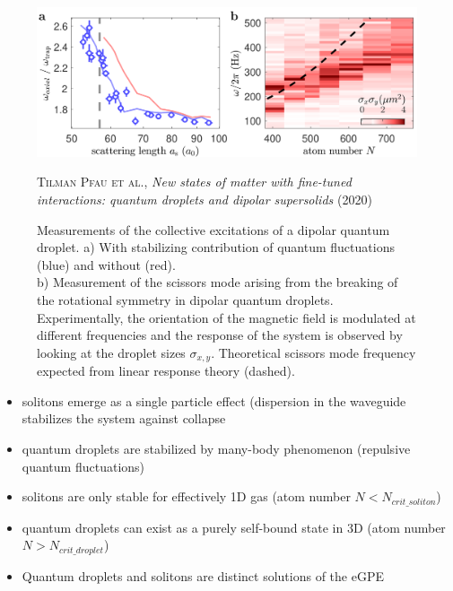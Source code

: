 \begin{figure}[H]
    \centering
    \includegraphics[width=1.0\textwidth]{IMAGE/collective_excitation.png}\\
    \caption{
      Measurements of the collective excitations of a dipolar quantum droplet.
      a) With stabilizing contribution of quantum fluctuations (blue) and without (red). \\
      b) Measurement of the scissors mode arising from the breaking of the
rotational symmetry in dipolar quantum droplets. Experimentally, the orientation of
the magnetic field is modulated at different frequencies and the response of the system
is observed by looking at the droplet sizes $\sigma_{x,y}$. Theoretical scissors mode frequency expected from linear response theory (dashed).
}
    \textsc{Tilman Pfau et al.}, \emph{New states of matter with fine-tuned interactions: quantum droplets and dipolar supersolids} (2020)
    \label{fig:collective}
\end{figure}


\begin{itemize}
    \item solitons emerge as a single particle effect (dispersion in the waveguide stabilizes the system against collapse
    \item quantum droplets are stabilized by many-body phenomenon (repulsive quantum fluctuations)
    \item solitons are only stable for effectively 1D gas (atom number $N < N_{crit\_soliton}$)
    \item quantum droplets can exist as a purely self-bound state in 3D (atom number $N > N_{crit\_droplet}$)
    \item Quantum droplets and solitons are distinct solutions of the eGPE
\end{itemize}

